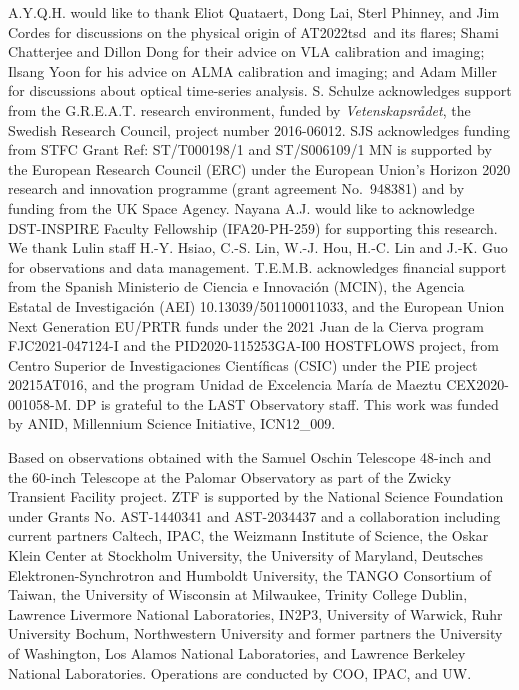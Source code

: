 \documentclass{nature_plusfigure}
\newcommand{\at}{AT2022tsd}
\begin{document}
\begin{addendum}

\item  A.Y.Q.H. would like to thank Eliot Quataert, Dong Lai, Sterl Phinney, and Jim Cordes for discussions on the physical origin of \at\ and its flares; Shami Chatterjee and Dillon Dong for their advice on VLA calibration and imaging; Ilsang Yoon for his advice on ALMA calibration and imaging; and Adam Miller for discussions about optical time-series analysis.
S. Schulze acknowledges support from the G.R.E.A.T. research environment, funded by {\em Vetenskapsr\aa det},  the Swedish Research Council, project number 2016-06012.
SJS acknowledges funding from STFC Grant Ref: ST/T000198/1 and ST/S006109/1
MN is supported by the European Research Council (ERC) under the European Union’s Horizon 2020 research and innovation programme (grant agreement No.~948381) and by funding from the UK Space Agency.
Nayana A.J. would like to acknowledge DST-INSPIRE Faculty Fellowship (IFA20-PH-259) for supporting this research.
We thank Lulin staff H.-Y. Hsiao, C.-S. Lin, W.-J. Hou, H.-C. Lin and J.-K. Guo for observations and data management. 
T.E.M.B. acknowledges financial support from the 
Spanish Ministerio de Ciencia e Innovaci\'on (MCIN), the Agencia 
Estatal de Investigaci\'on (AEI) 10.13039/501100011033, and the 
European Union Next Generation EU/PRTR funds under the 2021 Juan de la 
Cierva program FJC2021-047124-I and the PID2020-115253GA-I00 HOSTFLOWS 
project, from Centro Superior de Investigaciones Cient\'ificas (CSIC) 
under the PIE project 20215AT016, and the program Unidad de Excelencia 
Mar\'ia de Maeztu CEX2020-001058-M.
DP is grateful to the LAST Observatory staff.
This work was funded by ANID, Millennium Science Initiative, ICN12\_009.

Based on observations obtained with the Samuel Oschin Telescope 48-inch and the 60-inch Telescope at the Palomar Observatory as part of the Zwicky Transient Facility project. ZTF is supported by the National Science Foundation under Grants No. AST-1440341 and AST-2034437 and a collaboration including current partners Caltech, IPAC, the Weizmann Institute of Science, the Oskar Klein Center at Stockholm University, the University of Maryland, Deutsches Elektronen-Synchrotron and Humboldt University, the TANGO Consortium of Taiwan, the University of Wisconsin at Milwaukee, Trinity College Dublin, Lawrence Livermore National Laboratories, IN2P3, University of Warwick, Ruhr University Bochum, Northwestern University and former partners the University of Washington, Los Alamos National Laboratories, and Lawrence Berkeley National Laboratories. Operations are conducted by COO, IPAC, and UW.


\end{addendum}
\end{document}
